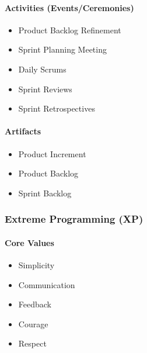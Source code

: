 \documentclass[letterpaper,10pt,english]{jupyterBook}
\begin{document}
\paragraph{Activities (Events/Ceremonies)}
\label{\detokenize{APM/agile:activities-events-ceremonies}}\begin{itemize}
\item {} 
\sphinxAtStartPar
Product Backlog Refinement

\item {} 
\sphinxAtStartPar
Sprint Planning Meeting

\item {} 
\sphinxAtStartPar
Daily Scrums

\item {} 
\sphinxAtStartPar
Sprint Reviews

\item {} 
\sphinxAtStartPar
Sprint Retrospectives

\end{itemize}


\paragraph{Artifacts}
\label{\detokenize{APM/agile:artifacts}}\begin{itemize}
\item {} 
\sphinxAtStartPar
Product Increment

\item {} 
\sphinxAtStartPar
Product Backlog

\item {} 
\sphinxAtStartPar
Sprint Backlog

\end{itemize}


\subsubsection{Extreme Programming (XP)}
\label{\detokenize{APM/agile:extreme-programming-xp}}

\paragraph{Core Values}
\label{\detokenize{APM/agile:core-values}}\begin{itemize}
\item {} 
\sphinxAtStartPar
Simplicity

\item {} 
\sphinxAtStartPar
Communication

\item {} 
\sphinxAtStartPar
Feedback

\item {} 
\sphinxAtStartPar
Courage

\item {} 
\sphinxAtStartPar
Respect

\end{itemize}
\end{document}
